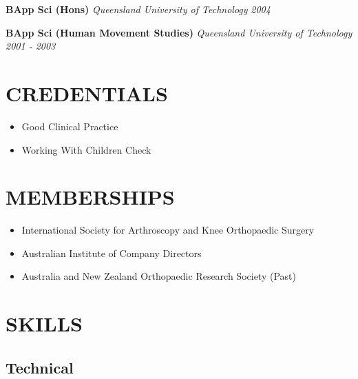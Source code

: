 \documentclass[
  letterpaper,
  DIV=11,
  numbers=noendperiod]{scrartcl}
\providecommand{\tightlist}{%
  \setlength{\itemsep}{0pt}\setlength{\parskip}{0pt}}\usepackage{longtable,booktabs,array}
\begin{document}
\textbf{BApp Sci (Hons)} \emph{Queensland University of Technology}
{\emph{2004}}

\textbf{BApp Sci (Human Movement Studies)} \emph{Queensland University
of Technology} {\emph{2001 - 2003}}

\section{CREDENTIALS}\label{credentials}

\begin{itemize}
\tightlist
\item
  Good Clinical Practice
\item
  Working With Children Check
\end{itemize}

\section{MEMBERSHIPS}\label{memberships}

\begin{itemize}
\tightlist
\item
  International Society for Arthroscopy and Knee Orthopaedic Surgery
\item
  Australian Institute of Company Directors
\item
  Australia and New Zealand Orthopaedic Research Society (Past)
\end{itemize}

\section{SKILLS}\label{skills}

\subsection{Technical}\label{technical}
\end{document}
